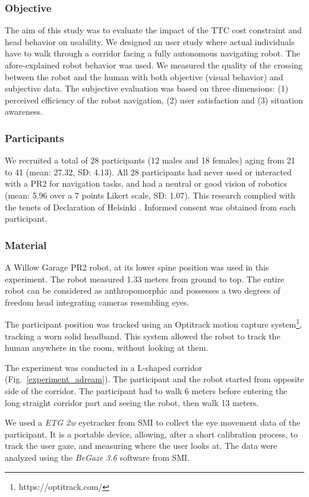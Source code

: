 \documentclass[a4paper,11pt,twoside]{StyleThese}
\begin{document}
\subsubsection{Objective}
The aim of this study was to evaluate the impact of the TTC cost constraint and head behavior on usability. We designed an user study where actual individuals have to walk through a corridor facing a fully autonomous navigating robot. The afore-explained robot behavior was used. We measured the quality of the crossing between the robot and the human with both objective (visual behavior) and subjective data. The subjective evaluation was based on three dimensions: (1) perceived efficiency of the robot navigation, (2) user satisfaction and (3) situation awareness.

\subsubsection{Participants}
We recruited a total of 28 participants (12 males and 18 females) aging from 21 to 41 (mean: 27.32, SD: 4.13). All 28 participants had never used or interacted with a PR2 for navigation tasks, and had a neutral or good vision of robotics (mean: 5.96 over a 7 points Likert scale, SD: 1.07). This research complied with the tenets of Declaration of Helsinki \cite{world2013world}. Informed consent was obtained from each participant.

\subsubsection{Material}
A Willow Garage PR2 robot, at its lower spine position was used in this experiment. The robot measured 1.33 meters from ground to top. The entire robot can be considered as anthropomorphic and possesses a two degrees of freedom head integrating cameras resembling eyes.

The participant position was tracked using an Optitrack motion capture system\footnote{https://optitrack.com/}, tracking a worn solid headband. This system allowed the robot to track the human anywhere in the room, without looking at them.

The experiment was conducted in a L-shaped corridor (Fig.~\ref{experiment_adream}). The participant and the robot started from opposite side of the corridor. The participant had to walk 6 meters before entering the long straight corridor part and seeing the robot, then walk 13 meters.

We used a \textit{ETG 2w} eyetracker from SMI to collect the eye movement data of the participant. It is a portable device, allowing, after a short calibration process, to track the user gaze, and measuring where the user looks at. The data were analyzed using the \textit{BeGaze 3.6} software from SMI.
\end{document}
